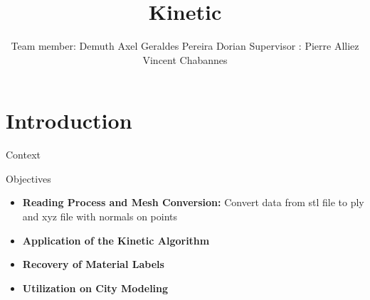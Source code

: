 \documentclass[10pt]{beamer}
\title{Kinetic}
\author[Demuth Axel, Geraldes Pereira Dorian]{Team member: \newline\newline Demuth Axel \newline Geraldes Pereira Dorian \newline\newline Supervisor :  \newline\newline Pierre Alliez \newline Vincent Chabannes}
\date{}
\begin{document}
\frame{\titlepage}
\begin{frame}
    \tableofcontents
\end{frame}
\section{Introduction}

\begin{frame}{Context}
\end{frame}
\begin{frame}{Objectives}
\begin{itemize}
    \item \textbf{Reading Process and Mesh Conversion: }Convert data from stl file to ply and xyz file with normals on points
    
    \item \textbf{Application of the Kinetic Algorithm}
    
    \item \textbf{Recovery of Material Labels}
    
    \item \textbf{Utilization on City Modeling}
\end{itemize}
\end{frame}
\end{document}
